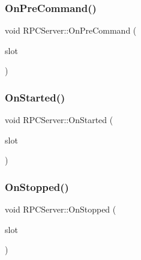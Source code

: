 \mbox{\label{namespace_r_p_c_server_a6150327eb9a893eb202bd7f922e3529f}} 
\subsubsection{\texorpdfstring{On\+Pre\+Command()}{OnPreCommand()}}
{\footnotesize\ttfamily void R\+P\+C\+Server\+::\+On\+Pre\+Command (\begin{DoxyParamCaption}\item[{boost\+::function$<$ void(const \mbox{\hyperlink{class_c_r_p_c_command}{C\+R\+P\+C\+Command}} \&)$>$}]{slot }\end{DoxyParamCaption})}

\mbox{\label{namespace_r_p_c_server_a7c3a8e18df87039ee9c3ea4217b89b0c}} 
\subsubsection{\texorpdfstring{On\+Started()}{OnStarted()}}
{\footnotesize\ttfamily void R\+P\+C\+Server\+::\+On\+Started (\begin{DoxyParamCaption}\item[{boost\+::function$<$ void()$>$}]{slot }\end{DoxyParamCaption})}

\mbox{\label{namespace_r_p_c_server_a281edbc9eae581611c3f8d0278c9ab69}} 
\subsubsection{\texorpdfstring{On\+Stopped()}{OnStopped()}}
{\footnotesize\ttfamily void R\+P\+C\+Server\+::\+On\+Stopped (\begin{DoxyParamCaption}\item[{boost\+::function$<$ void()$>$}]{slot }\end{DoxyParamCaption})}

